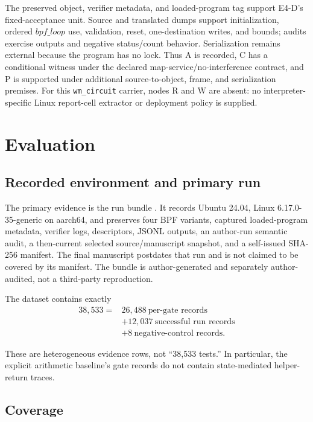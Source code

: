 \documentclass[conference]{IEEEtran}
\begin{document}
The preserved object, verifier metadata, and loaded-program tag support E4-D's fixed-acceptance unit. Source and translated dumps support initialization, ordered $\mathit{bpf\_loop}$ use, validation, reset, one-destination writes, and bounds; audits exercise outputs and negative status/count behavior. Serialization remains external because the program has no lock. Thus A is recorded, C has a conditional witness under the declared map-service/no-interference contract, and P is supported under additional source-to-object, frame, and serialization premises. For this \texttt{wm\_circuit} carrier, nodes R and W are absent: no interpreter-specific Linux report-cell extractor or deployment policy is supplied.

\section{Evaluation}

\subsection{Recorded environment and primary run}

The primary evidence is the run bundle . It records Ubuntu 24.04, Linux 6.17.0-35-generic on aarch64, and preserves four BPF variants, captured loaded-program metadata, verifier logs, descriptors, JSONL outputs, an author-run semantic audit, a then-current selected source/manuscript snapshot, and a self-issued SHA-256 manifest. The final manuscript postdates that run and is not claimed to be covered by its manifest. The bundle is author-generated and separately author-audited, not a third-party reproduction.

The dataset contains exactly
\begin{equation}
\begin{split}
38{,}533={}&26{,}488\ \text{per-gate records}\\
&+12{,}037\ \text{successful run records}\\
&+8\ \text{negative-control records}.
\end{split}
\end{equation}

These are heterogeneous evidence rows, not ``38,533 tests.'' In particular, the explicit arithmetic baseline's gate records do not contain state-mediated helper-return traces.

\subsection{Coverage}
\end{document}
